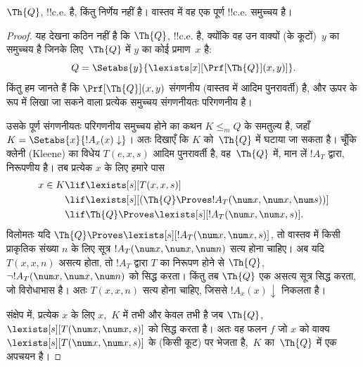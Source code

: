 \documentclass[../../../include/open-logic-section]{subfiles}
\begin{document}


\begin{thm}
$\Th{Q}$, !!{c.e.} है, किंतु निर्णेय नहीं है। वास्तव में वह एक पूर्ण
!!{c.e.} समुच्चय है।
\end{thm}

\begin{proof}
यह देखना कठिन नहीं है कि $\Th{Q}$, !!{c.e.} है, क्योंकि वह उन वाक्यों
(के कूटों)~$y$ का समुच्चय है जिनके लिए~$\Th{Q}$ में $y$ का कोई प्रमाण~$x$ है:
\[
Q = \Setabs{y}{\lexists[x][\Prf[\Th{Q}](x,y)]}.
\]
किंतु हम जानते हैं कि $\Prf[\Th{Q}](x,y)$ संगणनीय (वास्तव में आदिम
पुनरावर्ती) है, और ऊपर के रूप में लिखा जा सकने वाला प्रत्येक समुच्चय
संगणनीयतः परिगणनीय है।

उसके पूर्ण संगणनीयतः परिगणनीय समुच्चय होने का कथन $K \leq_m Q$ के समतुल्य है, जहाँ
$K = \Setabs{x}{!A_x(x) \downarrow}$। अतः दिखाएँ कि $K$ को~$\Th{Q}$ में
घटाया जा सकता है। चूँकि क्लेनी (Kleene) का विधेय $T(e,x,s)$ आदिम पुनरावर्ती
है, वह~$\Th{Q}$ में, मान लें $!A_T$ द्वारा, निरूपणीय है। तब प्रत्येक $x$
के लिए हमारे पास
\begin{align*}
x \in K & \lif \lexists[s][T(x,x,s)] \\
& \lif \lexists[s][(\Th{Q} \Proves !A_T(\num x,\num x, \num s))]
  \\
& \lif \Th{Q} \Proves \lexists[s][!A_T(\num x, \num x, s)].
\end{align*}
विलोमतः यदि
$\Th{Q} \Proves \lexists[s][!A_T(\num x, \num x, s)]$, तो वास्तव में
किसी प्राकृतिक संख्या $n$ के लिए सूत्र $!A_T(\num x, \num x, \num n)$
सत्य होना चाहिए। अब यदि $T(x,x,n)$ असत्य होता, तो $!A_T$ द्वारा $T$ का
निरूपण होने से $\Th{Q}$,~$\lnot !A_T(\num x, \num x, \num n)$ को सिद्ध
करता। किंतु तब $\Th{Q}$ एक असत्य सूत्र सिद्ध करता, जो विरोधाभास है। अतः
$T(x,x,n)$ सत्य होना चाहिए, जिससे $!A_x(x) \downarrow$ निकलता है।

संक्षेप में, प्रत्येक $x$ के लिए $x$,~$K$ में तभी और केवल तभी है जब
$\Th{Q}$,~$\lexists[s][T(\num x,\num x,s)]$ को सिद्ध करता है। अतः वह
फलन $f$ जो $x$ को वाक्य $\lexists[s][T(\num x, \num x, s)]$ के (किसी
कूट) पर भेजता है,~$K$ का~$\Th{Q}$ में एक अपचयन है।
\end{proof}
\end{document}
